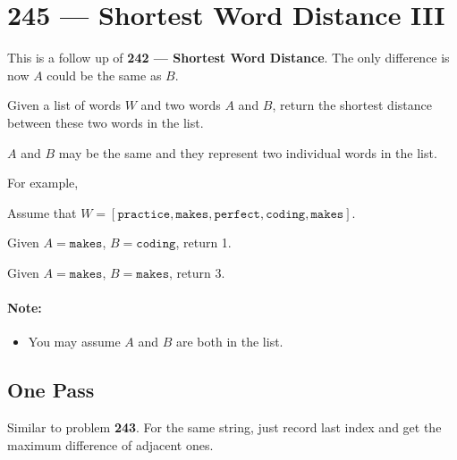 \section{245 --- Shortest Word Distance III}
This is a follow up of \textbf{242 --- Shortest Word Distance}. The only difference is now $A$ could be the same as $B$.
\par
Given a list of words $W$ and two words $A$ and $B$, return the shortest distance between these two words in the list.
\par
$A$ and $B$ may be the same and they represent two individual words in the list.
\par
For example,
\par
Assume that $W = [\texttt{practice}, \texttt{makes}, \texttt{perfect}, \texttt{coding}, \texttt{makes}]$.
\par
Given $A = \texttt{makes}$, $B = \texttt{coding}$, return 1.
\par
Given $A = \texttt{makes}$, $B = \texttt{makes}$, return 3.
\paragraph{Note:}
\begin{itemize}
\item You may assume $A$ and $B$ are both in the list.
\end{itemize}

\subsection{One Pass}
Similar to problem \textbf{243}. For the same string, just record last index and get the maximum difference of adjacent ones.